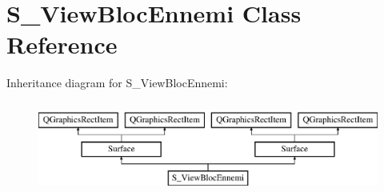 \hypertarget{class_s___view_bloc_ennemi}{}\section{S\+\_\+\+View\+Bloc\+Ennemi Class Reference}
\label{class_s___view_bloc_ennemi}
Inheritance diagram for S\+\_\+\+View\+Bloc\+Ennemi\+:\begin{figure}[H]
\begin{center}
\leavevmode
\includegraphics[height=3.000000cm]{class_s___view_bloc_ennemi}
\end{center}
\end{figure}
